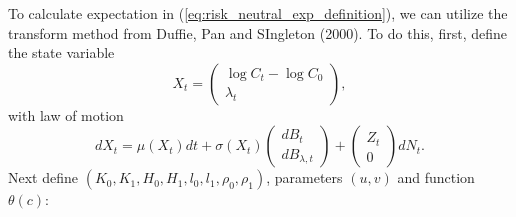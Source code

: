 \documentclass[11pt]{article}
\begin{document}
To calculate expectation in (\ref{eq:risk_neutral_exp_definition}), we can utilize the transform method from Duffie, Pan and SIngleton (2000). To do this, first, define the state variable
\[
    X_t = \begin{pmatrix}
        \log C_t - \log C_0 \\ \lambda_t
    \end{pmatrix},
\]
with law of motion
\[
    dX_t = \mu(X_t) dt +  \sigma(X_t)\begin{pmatrix}
        dB_t \\ dB_{\lambda,t}
    \end{pmatrix} + \begin{pmatrix}
        Z_t \\ 0
    \end{pmatrix}dN_t.
\]
Next define $(K_0, K_1, H_0, H_1, l_0, l_1, \rho_0, \rho_1)$, parameters $(u, v)$ and function $\theta(c)$:
\end{document}
